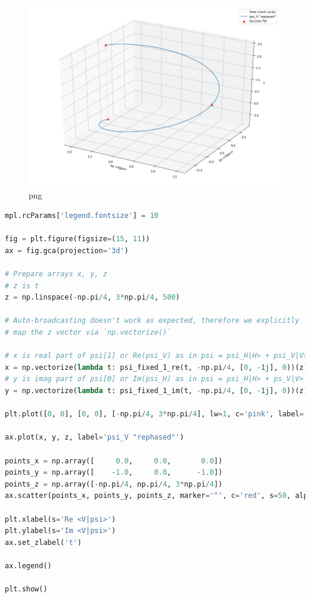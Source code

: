 \begin{figure}
\centering
\includegraphics[width=\textwidth/2]{img/psi_H.png}
\caption[(from notebook)]{png}
\end{figure}

\begin{lstlisting}[language=Python]
mpl.rcParams['legend.fontsize'] = 10

fig = plt.figure(figsize=(15, 11))
ax = fig.gca(projection='3d')

# Prepare arrays x, y, z
# z is t
z = np.linspace(-np.pi/4, 3*np.pi/4, 500)

# Auto-broadcasting doesn't work as expected, therefore we explicitly
# map the z vector via `np.vectorize()`

# x is real part of psi[1] or Re(psi_V) as in psi = psi_H|H> + psi_V|V>
x = np.vectorize(lambda t: psi_fixed_1_re(t, -np.pi/4, [0, -1j], 0))(z) 
# y is imag part of psi[0] or Im(psi_H) as in psi = psi_H|H> + ps_V|V>
y = np.vectorize(lambda t: psi_fixed_1_im(t, -np.pi/4, [0, -1j], 0))(z) 

plt.plot([0, 0], [0, 0], [-np.pi/4, 3*np.pi/4], lw=1, c='pink', label='Time (clock cycle)')

ax.plot(x, y, z, label='psi_V "rephased"')

points_x = np.array([     0.0,     0.0,       0.0])
points_y = np.array([    -1.0,     0.0,      -1.0])
points_z = np.array([-np.pi/4, np.pi/4, 3*np.pi/4])
ax.scatter(points_x, points_y, points_z, marker='^', c='red', s=50, alpha=1.0, label='discrete PW')

plt.xlabel(s='Re <V|psi>')
plt.ylabel(s='Im <V|psi>')
ax.set_zlabel('t')

ax.legend()

plt.show()
\end{lstlisting}


